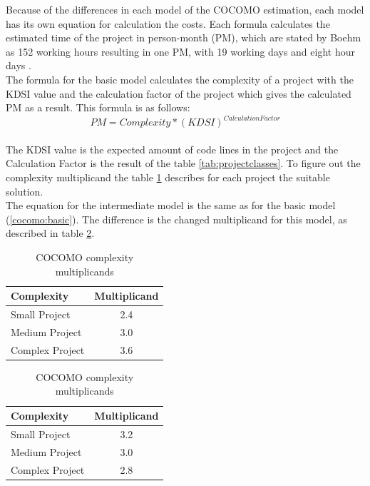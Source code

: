 Because of the differences in each model of the COCOMO estimation, each model has its own equation for calculation the costs. Each formula calculates the estimated time of the project in person-month (PM), which are stated by Boehm as 152 working hours resulting in one PM, with 19 working days and eight hour days \cite{boehm}. \\
The formula for the basic model calculates the complexity of a project with the KDSI value and the calculation factor of the project which gives the calculated PM as a result. This formula is as follows:\\
\begin{equation}
PM = Complexity * (KDSI)^{Calculation Factor} \label{cocomo:basic}
\end{equation}\\
The KDSI value is the expected amount of code lines in the project and the Calculation Factor is the result of the table \ref{tab:projectclasses}. To figure out the complexity multiplicand the table \ref{cocomo:basicComplexity} describes for each project the suitable solution.\\
The equation for the intermediate model is the same as for the basic model (\ref{cocomo:basic}). The difference is the changed multiplicand for this model, as described in table \ref{cocomo:intermediateComplexity}.\\
\begin{table}[h]
	\centering 
	\setlength{\tabcolsep}{4pt}
	\begin{tabular}{|l||c|}\hline
		Complexity	& Multiplicand\\ \hline\hline
		Small Project   	& 2.4        		\\ \hline
		Medium Project 		& 3.0        		\\ \hline
		Complex Project 	& 3.6 			\\ \hline
	\end{tabular} 
	\caption{COCOMO complexity multiplicands} 
	\label{cocomo:basicComplexity} 
\end{table}
\begin{table}[h]
	\centering 
	\setlength{\tabcolsep}{4pt}
	\begin{tabular}{|l||c|}\hline
		Complexity	& Multiplicand\\ \hline\hline
		Small Project   	& 3.2        		\\ \hline
		Medium Project 		& 3.0        		\\ \hline
		Complex Project 	& 2.8 			\\ \hline
	\end{tabular} 
	\caption{COCOMO complexity multiplicands} 
	\label{cocomo:intermediateComplexity} 
\end{table}\\
